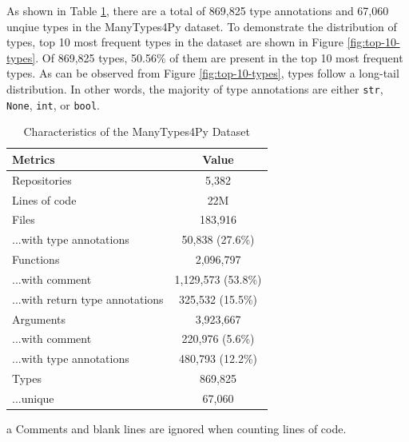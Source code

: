 \documentclass[10pt, conference]{IEEEtran}
\begin{document}
As shown in Table \ref{tab:char-dataset}, there are a total of 869,825 type annotations and 67,060 unqiue types in the ManyTypes4Py dataset. To demonstrate the distribution of types, top 10 most frequent types in the dataset are shown in Figure \ref{fig:top-10-types}. Of 869,825 types, 50.56\% of them are present in the top 10 most frequent types. As can be observed from Figure \ref{fig:top-10-types}, types follow a long-tail distribution. In other words, the majority of type annotations are either \texttt{str}, \texttt{None}, \texttt{int}, or \texttt{bool}.

\begin{table}[!t]
	\centering
	\label{tab:char-dataset}
	\caption{Characteristics of the ManyTypes4Py Dataset}
	\begin{threeparttable}
		\begin{tabular}{l c}
			\toprule
			Metrics & Value \\
			\midrule
			Repositories & 5,382 \\
			Lines of code\tnote{a} & 22M \\
			\midrule
			Files & 183,916 \\
			...with type annotations & 50,838 (27.6\%) \\
			\midrule
			Functions & 2,096,797 \\
			...with comment & 1,129,573 (53.8\%) \\
			...with return type annotations & 325,532 (15.5\%)  \\
			\midrule
			Arguments & 3,923,667 \\
			...with comment & 220,976 (5.6\%) \\ 
			...with type annotations & 480,793 (12.2\%) \\
			\midrule
			Types & 869,825 \\
			...unique & 67,060 \\
			\bottomrule
		\end{tabular}
		\begin{tablenotes}
			\item[a] {\footnotesize Comments and blank lines are ignored when counting lines of code.}
		\end{tablenotes}
	\end{threeparttable}
\end{table}
\end{document}
